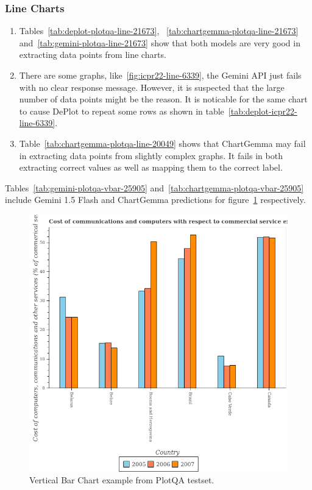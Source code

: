 \documentclass[
	letterpaper, %
]{jdf}
\begin{document}
       \subsubsection{Line Charts}\label{sssect:line-errors}
       \begin{enumerate}
  \item Tables~\ref{tab:deplot-plotqa-line-21673}, ~\ref{tab:chartgemma-plotqa-line-21673} and~\ref{tab:gemini-plotqa-line-21673} show that both models are very good in extracting data points from line charts.
     \item There are some graphs, like~\ref{fig:icpr22-line-6339}, the Gemini API just fails with no clear response message.
       However, it is suspected that the large number of data points might be the reason.
               It is noticable for the same chart to cause DePlot to repeat some rows as shown in table~\ref{tab:deplot-icpr22-line-6339}.
     \item Table~\ref{tab:chartgemma-plotqa-line-20049} shows that ChartGemma may fail in extracting data points from slightly complex graphs.
       It fails in both extracting correct values as well as mapping them to the correct label.
              \end{enumerate}
       Tables~\ref{tab:gemini-plotqa-vbar-25905} and~\ref{tab:chartgemma-plotqa-vbar-25905} include Gemini 1.5 Flash and ChartGemma predictions for figure~\ref{fig:plotqa-vbar-25905} respectively.
\begin{figure}
   \includegraphics{test-sample/plotqa/images/vertical-bar/25905.png}
   \caption{Vertical Bar Chart example from PlotQA testset.}\label{fig:plotqa-vbar-25905}
   \end{figure}



\end{document}
